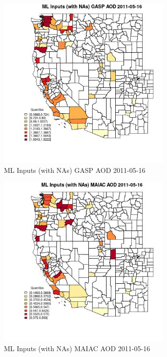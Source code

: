 \begin{figure} 
\centering  
\includegraphics[width=0.77\textwidth]{Code_Outputs/Report_ML_input_PM25_Step4_part_e_de_duplicated_aveswNAs_CountyGASP_AODMean2011-05-16_2011-05-16.jpg} 
\caption{\label{fig:Report_ML_input_PM25_Step4_part_e_de_duplicated_aveswNAsCountyGASP_AODMean2011-05-16_2011-05-16}ML Inputs (with NAs) GASP AOD 2011-05-16} 
\end{figure} 
 

\begin{figure} 
\centering  
\includegraphics[width=0.77\textwidth]{Code_Outputs/Report_ML_input_PM25_Step4_part_e_de_duplicated_aveswNAs_CountyMAIAC_AODMean2011-05-16_2011-05-16.jpg} 
\caption{\label{fig:Report_ML_input_PM25_Step4_part_e_de_duplicated_aveswNAsCountyMAIAC_AODMean2011-05-16_2011-05-16}ML Inputs (with NAs) MAIAC AOD 2011-05-16} 
\end{figure} 
 

